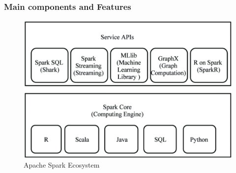 \subsubsection{Main components and Features}

\begin{figure}[ht]
    \centering
    \includegraphics[width=1\linewidth]{images/Spark_Eco.png}
    \caption{Apache Spark Ecosystem}
    \label{fig:spark-eco}
\end{figure}

